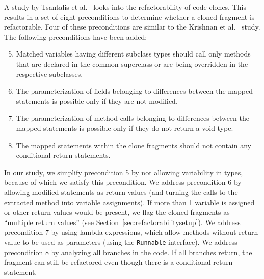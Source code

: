 A study by Tsantalis et al.~\cite{tsantalis2015assessing} looks into the refactorability of code clones. This results in a set of eight preconditions to determine whether a cloned fragment is refactorable. Four of these preconditions are similar to the Krishnan et al.~\cite{krishnan2014unification} study. The following preconditions have been added:
\begin{enumerate}
  \setcounter{enumi}{4}
  \item Matched variables having different subclass types should call only methods that are declared in the common superclass or are being overridden in the respective subclasses.
  \item The parameterization of fields belonging to differences between the mapped statements is possible only if they are not modified.
  \item The parameterization of method calls belonging to differences between the mapped statements is possible only if they do not return a void type.
  \item The mapped statements within the clone fragments should not contain any conditional return statements.
\end{enumerate}
In our study, we simplify precondition 5 by not allowing variability in types, because of which we satisfy this precondition. We address precondition 6 by allowing modified statements as return values (and turning the calls to the extracted method into variable assignments). If more than 1 variable is assigned or other return values would be present, we flag the cloned fragments as ``multiple return values'' (see Section~\ref{sec:refactorabilitysetup}). We address precondition 7 by using lambda expressions, which allow methods without return value to be used as parameters (using the \texttt{Runnable} interface). We address precondition 8 by analyzing all branches in the code. If all branches return, the fragment can still be refactored even though there is a conditional return statement.

